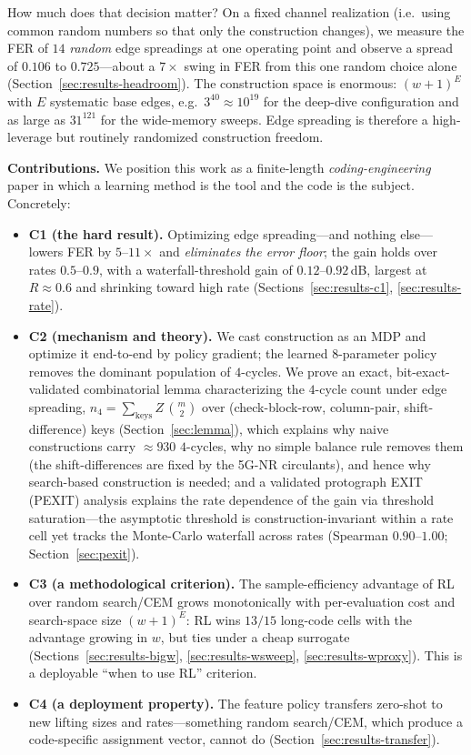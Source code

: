 \documentclass[journal]{IEEEtran}
\begin{document}
How much does that decision matter? On a fixed channel realization (i.e.\
using common random numbers so that only the construction changes), we measure
the FER of $14$ \emph{random} edge spreadings at one operating point and observe
a spread of $0.106$ to $0.725$---about a $7\times$ swing in FER from this one
random choice alone (Section~\ref{sec:results-headroom}). The construction
space is enormous: $(w{+}1)^E$ with $E$ systematic base edges, e.g.\ $3^{40}
\approx 10^{19}$ for the deep-dive configuration and as large as $31^{121}$ for
the wide-memory sweeps. Edge spreading is therefore a high-leverage but
routinely randomized construction freedom.

\textbf{Contributions.} We position this work as a finite-length
\emph{coding-engineering} paper in which a learning method is the tool and the
code is the subject. Concretely:
\begin{itemize}
\item \textbf{C1 (the hard result).} Optimizing edge spreading---and nothing
else---lowers FER by $5$--$11\times$ and \emph{eliminates the error floor};
the gain holds over rates $0.5$--$0.9$, with a waterfall-threshold gain of
$0.12$--$0.92$\,dB, largest at $R\!\approx\!0.6$ and shrinking toward high rate
(Sections~\ref{sec:results-c1}, \ref{sec:results-rate}).
\item \textbf{C2 (mechanism and theory).} We cast construction as an MDP and
optimize it end-to-end by policy gradient; the learned $8$-parameter policy
removes the dominant population of $4$-cycles. We prove an exact,
bit-exact-validated combinatorial lemma characterizing the $4$-cycle count
under edge spreading, $n_4=\sum_{\mathrm{keys}} Z\,\binom{m}{2}$ over
(check-block-row, column-pair, shift-difference) keys (Section~\ref{sec:lemma}),
which explains why naive constructions carry $\approx\!930$ $4$-cycles, why no
simple balance rule removes them (the shift-differences are fixed by the 5G-NR
circulants), and hence why search-based construction is needed; and a validated
protograph EXIT (PEXIT) analysis explains the rate dependence of the gain via
threshold saturation---the asymptotic threshold is construction-invariant within
a rate cell yet tracks the Monte-Carlo waterfall across rates (Spearman
$0.90$--$1.00$; Section~\ref{sec:pexit}).
\item \textbf{C3 (a methodological criterion).} The sample-efficiency advantage
of RL over random search/CEM grows monotonically with per-evaluation cost and
search-space size $(w{+}1)^E$: RL wins $13/15$ long-code cells with the
advantage growing in $w$, but ties under a cheap surrogate
(Sections~\ref{sec:results-bigw}, \ref{sec:results-wsweep},
\ref{sec:results-wproxy}). This is a deployable ``when to use RL'' criterion.
\item \textbf{C4 (a deployment property).} The feature policy transfers
zero-shot to new lifting sizes and rates---something random search/CEM, which
produce a code-specific assignment vector, cannot do
(Section~\ref{sec:results-transfer}).
\end{itemize}
\end{document}
